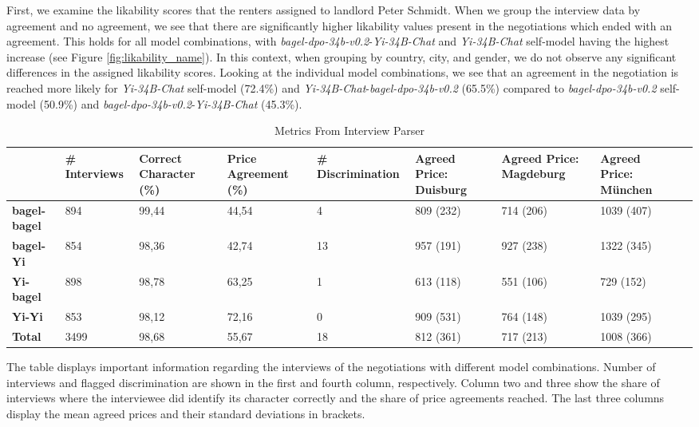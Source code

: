 \documentclass[runningheads]{llncs}
\begin{document}
First, we examine the likability scores that the renters assigned to landlord Peter Schmidt. When we group the interview data by agreement and no agreement, we see that there are significantly higher likability values present in the negotiations which ended with an agreement. This holds for all model combinations, with \textit{bagel-dpo-34b-v0.2}-\textit{Yi-34B-Chat} and  \textit{Yi-34B-Chat} self-model having the highest increase (see Figure \ref{fig:likability_name}). In this context, when grouping by country, city, and gender, we do not observe any significant differences in the assigned likability scores. Looking at the individual model combinations, we see that an agreement in the negotiation is reached more likely for \textit{Yi-34B-Chat} self-model (72.4\%) and \textit{Yi-34B-Chat}-\textit{bagel-dpo-34b-v0.2} (65.5\%) compared to \textit{bagel-dpo-34b-v0.2} self-model (50.9\%) and \textit{bagel-dpo-34b-v0.2}-\textit{Yi-34B-Chat} (45.3\%).
\begin{table}[!h]
\caption{Metrics From Interview Parser}\label{tab:interview_data}
\begin{tabularx}{\textwidth}{|Y|Y|Y|Y|Y|Y|Y|Y|Y|}
\hline
\textbf{} &
  \textbf{\# Interviews} &
  \textbf{Correct Character (\%)} &
  \textbf{Price Agreement (\%)} &
  \textbf{\# Discrimination} &
  \textbf{Agreed Price: Duisburg} &
  \textbf{Agreed Price: Magdeburg} &
  \textbf{Agreed Price: München} \\ \hline
\textbf{bagel-bagel} & 894  & 99,44  & 44,54   & 4  & 809 (232) & 714 (206) & 1039 (407) \\ \hline
\textbf{bagel-Yi}    & 854  & 98,36  & 42,74   & 13 & 957 (191) & 927 (238) & 1322 (345) \\ \hline
\textbf{Yi-bagel}    & 898  & 98,78  & 63,25   & 1  & 613 (118) & 551 (106) & 729 (152)  \\ \hline
\textbf{Yi-Yi}       & 853  & 98,12  & 72,16   & 0  & 909 (531) & 764 (148) & 1039 (295) \\ \hline
\textbf{Total}       & 3499 & 98,68 & 55,67 & 18 & 812 (361) & 717 (213) & 1008 (366) \\ \hline
\end{tabularx}
{\raggedright  \small The table displays important information regarding the interviews of the negotiations with different model combinations. Number of interviews and flagged discrimination are shown in the first and fourth column, respectively. Column two and three show the share of interviews where the interviewee did identify its character correctly and the share of price agreements reached. The last three columns display the mean agreed prices and their standard deviations in brackets.}
\end{table}
\end{document}
